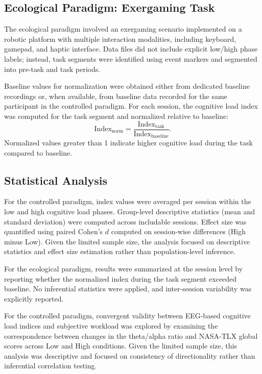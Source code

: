 \documentclass[letterpaper, 10 pt, conference]{ieeeconf}
\begin{document}
\subsection{Ecological Paradigm: Exergaming Task}
The ecological paradigm involved an exergaming scenario implemented on a robotic platform with multiple interaction modalities, including keyboard, gamepad, and haptic interface. Data files did not include explicit low/high phase labels; instead, task segments were identified using event markers and segmented into pre-task and task periods.

Baseline values for normalization were obtained either from dedicated baseline recordings or, when available, from baseline data recorded for the same participant in the controlled paradigm. For each session, the cognitive load index was computed for the task segment and normalized relative to baseline:
\[
\mathrm{Index}_{\mathrm{norm}} = \frac{\mathrm{Index}_{\mathrm{task}}}{\mathrm{Index}_{\mathrm{baseline}}}.
\]
Normalized values greater than 1 indicate higher cognitive load during the task compared to baseline.

\subsection{Statistical Analysis}
For the controlled paradigm, index values were averaged per session within the low and high cognitive load phases. Group-level descriptive statistics (mean and standard deviation) were computed across includable sessions. Effect size was quantified using paired Cohen’s $d$ computed on session-wise differences (High minus Low). Given the limited sample size, the analysis focused on descriptive statistics and effect size estimation rather than population-level inference.

For the ecological paradigm, results were summarized at the session level by reporting whether the normalized index during the task segment exceeded baseline. No inferential statistics were applied, and inter-session variability was explicitly reported.

For the controlled paradigm, convergent validity between EEG-based cognitive load indices and subjective workload was explored by examining the correspondence between changes in the theta/alpha ratio and NASA-TLX global scores across Low and High conditions. Given the limited sample size, this analysis was descriptive and focused on consistency of directionality rather than inferential correlation testing.
\end{document}
